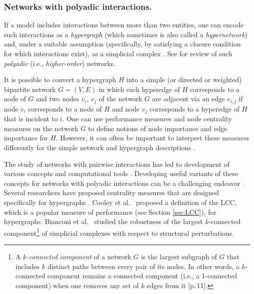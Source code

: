 \documentclass{comnet-mod}
\begin{document}
\subsubsection{Networks with polyadic interactions.}

If a model includes interactions between more than two entities, one can encode such interactions as a \textit{hypergraph} (which sometimes is also called a \textit{hypernetwork}) \cite{Ramadan2004, Ghoshal2009, Klamt2009, Zlatic2009, Zhang2010, Young2020} and, under a suitable assumption (specifically, by satisfying a closure condition for which interactions exist), as a simplicial complex \cite{Otter2017}. See \cite{Lambiotte2019, Battiston2020, Torres2020, Battiston2021, Bianconi2021, Battiston2022, Bick2023, Boccaletti2023} for review of such \emph{polyadic} (i.e., \emph{higher-order}) networks. 
 
It is possible to convert a hypergraph $H$ into a simple (or directed or weighted) bipartite network $G=(V,E)$ in which each hyperedge of $H$ corresponds to a node of $G$ and two nodes $v_i$, $v_j$ of the network $G$ are adjacent via an edge $e_{i,j}$ if node $v_i$ corresponds to a node of $H$ and node $v_j$ corresponds to a hyperedge of $H$ that is incident to $i$. One can use performance measures and node centrality measures on the network $G$ to define notions of node importance and edge importance for $H$. However, it can often be important to interpret these measures differently for the simple network and hypergraph descriptions \cite{Benson2019}. 

The study of networks with pairwise interactions has led to development of various concepts and computational tools \cite{Newman2018}. Developing useful variants of these concepts for networks with polyadic interactions can be a challenging endeavor \cite{Torres2020, Battiston2021, Bianconi2021, Battiston2022}. Several researchers have proposed centrality measures that are designed specifically for hypergraphs \cite{Bonacich2004, Kapoor2013, Benson2019}. Cooley et al.~\cite{Cooley2018} proposed a definition of the LCC, which is a popular measure of performance (see Section \ref{sec:LCC}), for hypergraphs. Bianconi et al.~\cite{Bianconi2018} studied the robustness of the largest $k$-connected component\footnote{A \emph{$k$-connected component} of a network $G$ is the largest subgraph of $G$ that includes $k$ distinct paths between every pair of its nodes. In other words, a $k$-connected component remains a connected component (i.e., a 1-connected component) when one removes any set of $k$ edges from it \cite{Diestel2017}[p.\,11].} of simplicial complexes with respect to structural perturbations. 
\end{document}
